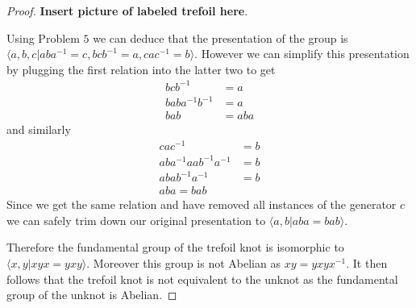 \documentclass[10pt]{article}
\newcommand{\sk}{\vskip 10mm}
\theoremstyle{plain}
\theoremstyle{remark}
\begin{document}
\begin{proof}
  \textbf{Insert picture of labeled trefoil here}.

  Using Problem $5$ we can deduce that the presentation of the group is
  $\langle a,b,c | aba^{-1}=c,bcb^{-1}=a,cac^{-1}=b\rangle$. However we can simplify this
  presentation by plugging the first relation into the latter two to get
  \begin{align*}
    bcb^{-1} &= a\\
    baba^{-1}b^{-1} &= a \\
    bab &= aba
  \end{align*}
  and similarly
  \begin{align*}
    cac^{-1} &= b\\
    aba^{-1}aab^{-1}a^{-1} &= b \\
    abab^{-1}a^{-1} &= b\\
    aba = bab
  \end{align*}
  Since we get the same relation and have removed all instances of the generator
  $c$ we can safely trim down our original presentation to
  $\langle a,b| aba=bab\rangle$.

  Therefore the fundamental group of the trefoil knot is isomorphic to
  $\langle x,y| xyx=yxy\rangle$. Moreover this group is not Abelian as
  $xy = yxyx^{-1}$. It then follows that the trefoil knot is not equivalent to the
  unknot as the fundamental group of the unknot is Abelian.
\end{proof}

\sk

\end{document}
